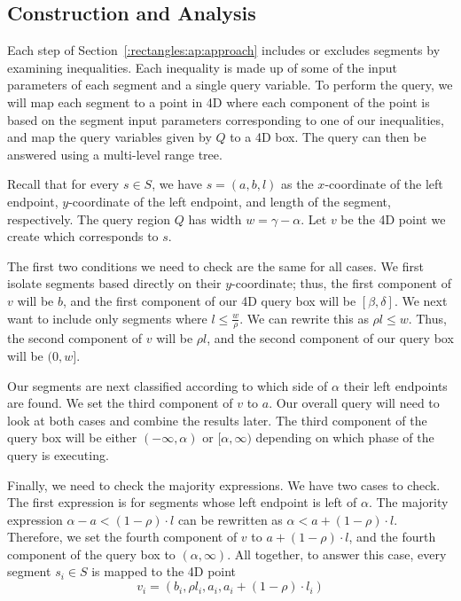 \subsection{Construction and Analysis}
\label{:rectangles:ap:analysis}

Each step of Section~\ref{:rectangles:ap:approach} includes or excludes segments by examining inequalities. Each inequality is made up of some of the input parameters of each segment and a single query variable. To perform the query, we will map each segment to a point in 4D where each component of the point is based on the segment input parameters corresponding to one of our inequalities, and map the query variables given by $Q$ to a 4D box. The query can then be answered using a multi-level range tree.

Recall that for every $s \in S$, we have $s = (a, b, l)$ as the $x$-coordinate of the left endpoint, $y$-coordinate of the left endpoint, and length of the segment, respectively.  The query region $Q$ has width $w = \gamma - \alpha$. Let $v$ be the 4D point we create which corresponds to $s$.

The first two conditions we need to check are the same for all cases. 
We first isolate segments based directly on their $y$-coordinate; thus, the first component of $v$ will be $b$, and the first component of our 4D query box will be $[\beta, \delta]$.
We next want to include only segments where $l \leq \frac{w}{\rho}$. We can rewrite this as $\rho l \leq w$. 
Thus, the second component of $v$ will be $\rho l$, and the second component of our query box will be $(0, w]$.

Our segments are next classified according to which side of $\alpha$ their left endpoints are found.
We set the third component of $v$ to $a$.
Our overall query will need to look at both cases and combine the results later. 
The third component of the query box will be either $(-\infty, \alpha)$ or $[\alpha, \infty)$ depending on which phase of the query is executing.

Finally, we need to check the majority expressions. We have two cases to check. The first expression is for segments whose left endpoint is left of $\alpha$. The majority expression $\alpha - a < (1 - \rho) \cdot l$ can be rewritten as $\alpha < a + (1-\rho) \cdot l$. Therefore, we set the fourth component of $v$ to $a + (1 - \rho) \cdot l$, and the fourth component of the query box to $(\alpha, \infty)$.  All together, to answer this case, every segment $s_i \in S$ is mapped to the 4D point 
\[ 
v_i = (b_i, \rho l_i, a_i, a_i + (1-\rho) \cdot l_i)
\]

